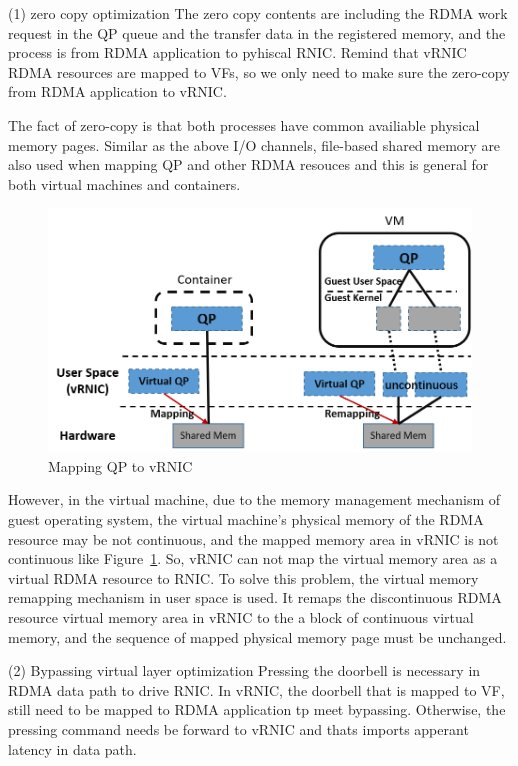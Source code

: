 (1) zero copy optimization
The zero copy contents are including the RDMA work request in the QP queue and the transfer data in the registered memory, and the process is from RDMA application to pyhiscal RNIC. Remind that vRNIC RDMA resources are mapped to VFs, so we only need to make sure the zero-copy from RDMA application to vRNIC.

The fact of zero-copy is that both processes have common availiable physical memory pages. Similar as the above I/O channels, file-based shared memory are also used when mapping QP and other RDMA resouces and this is general for both virtual machines and containers.

\begin{figure}[!ht]
	\centering
	\includegraphics[width=1.0\linewidth]{images/zero-copy}
	\caption{Mapping QP to vRNIC}
	\label{fig:zero-copy}
\end{figure}

However, in the virtual machine, due to the memory management mechanism of guest operating system, the virtual machine's physical memory of the RDMA resource may be not continuous, and the mapped memory area in vRNIC is not continuous like Figure~\ref{fig:zero-copy}. So, vRNIC can not map the virtual memory area as a virtual RDMA resource to RNIC. To solve this problem, the virtual memory remapping mechanism in user space is used. It remaps the discontinuous RDMA resource virtual memory area in vRNIC to the a block of continuous virtual memory, and the  sequence of mapped physical memory page must be unchanged.

(2) Bypassing virtual layer optimization
Pressing the doorbell is necessary in RDMA data path to drive RNIC. In vRNIC, the doorbell that is mapped to VF, still need to be mapped to RDMA application tp meet bypassing. Otherwise, the pressing command needs be forward to vRNIC and thats imports apperant latency in data path.

